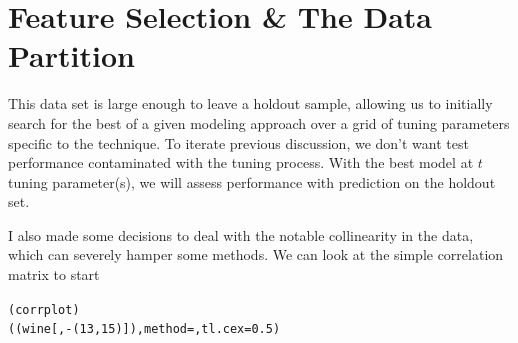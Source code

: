 \section{Feature Selection \& The Data Partition}
This data set is large enough to leave a holdout sample, allowing us to initially search for the best of a given modeling approach over a grid of tuning parameters specific to the technique.  To iterate previous discussion, we don't want test performance contaminated with the tuning process.  With the best model at $t$ tuning parameter(s), we will assess performance with prediction on the holdout set.

I also made some decisions to deal with the notable collinearity in the data, which can severely hamper some methods.  We can look at the simple correlation matrix to start

\begin{knitrout}\footnotesize
{}\color{fgcolor}\begin{kframe}
\begin{alltt}
(corrplot)
((wine[, -(13, 15)]), method = , tl.cex = 0.5)
\end{alltt}
\end{kframe}
\end{knitrout}


